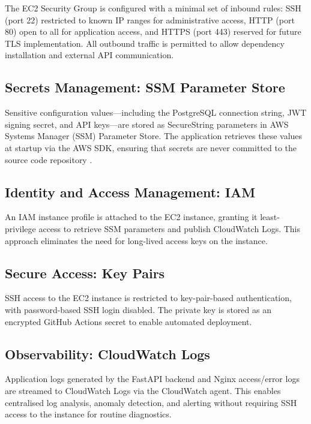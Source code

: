 \documentclass[conference]{IEEEtran}
\begin{document}
The EC2 Security Group is configured with a minimal set of inbound rules: SSH (port 22) restricted to known IP ranges for administrative access, HTTP (port 80) open to all for application access, and HTTPS (port 443) reserved for future TLS implementation. All outbound traffic is permitted to allow dependency installation and external API communication.

\subsection{Secrets Management: SSM Parameter Store}

Sensitive configuration values---including the PostgreSQL connection string, JWT signing secret, and API keys---are stored as SecureString parameters in AWS Systems Manager (SSM) Parameter Store. The application retrieves these values at startup via the AWS SDK, ensuring that secrets are never committed to the source code repository \cite{aws2024ssm}.

\subsection{Identity and Access Management: IAM}

An IAM instance profile is attached to the EC2 instance, granting it least-privilege access to retrieve SSM parameters and publish CloudWatch Logs. This approach eliminates the need for long-lived access keys on the instance.

\subsection{Secure Access: Key Pairs}

SSH access to the EC2 instance is restricted to key-pair-based authentication, with password-based SSH login disabled. The private key is stored as an encrypted GitHub Actions secret to enable automated deployment.

\subsection{Observability: CloudWatch Logs}

Application logs generated by the FastAPI backend and Nginx access/error logs are streamed to CloudWatch Logs via the CloudWatch agent. This enables centralised log analysis, anomaly detection, and alerting without requiring SSH access to the instance for routine diagnostics.
\end{document}
